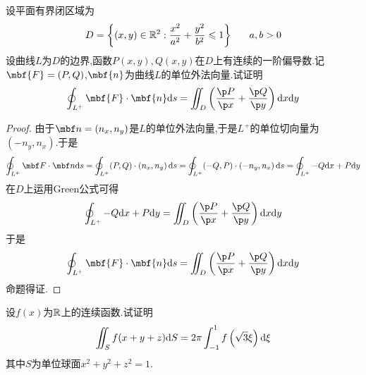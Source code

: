 \documentclass{ctexart}
\begin{document}
\begin{problem}[8.(10\songti{分})]
    设平面有界闭区域为
    \[D=\left\{(x,y)\in\R^2:\dfrac{x^2}{a^2}+\dfrac{y^2}{b^2}\leqslant1\right\}\ \ \ \ \ a,b>0\]
    设曲线$L$为$D$的边界,函数$P(x,y),Q(x,y)$在$D$上有连续的一阶偏导数.记$\mbf{F}=(P,Q)$,$\mbf{n}$为曲线$L$的单位外法向量.试证明
    \[\oint_{L^+}\mbf{F}\cdot\mbf{n}\di s=\iint_{D}\left(\dfrac{\p P}{\p x}+\dfrac{\p Q}{\p y}\right)\di x\di y\]
\end{problem}
\begin{proof}
    由于$\mbf n=\left(n_x,n_y\right)$是$L$的单位外法向量,于是$L^+$的单位切向量为$\left(-n_y,n_x\right)$.于是
    \[\oint_{L^+}\mbf F\cdot\mbf n\di s
    =\oint_{L^+}(P,Q)\cdot\left(n_x,n_y\right)\di s
    =\oint_{L^+}(-Q,P)\cdot\left(-n_y,n_x\right)\di s
    =\oint_{L^+}-Q\di x+P\di y\]
    在$D$上运用Green公式可得
    \[\oint_{L^+}-Q\di x+P\di y=\iint_D\left(\dfrac{\p P}{\p x}+\dfrac{\p Q}{\p y}\right)\di x\di y\]
    于是
    \[\oint_{L^+}\mbf{F}\cdot\mbf{n}\di s=\iint_{D}\left(\dfrac{\p P}{\p x}+\dfrac{\p Q}{\p y}\right)\di x\di y\]
    命题得证.
\end{proof}
\begin{problem}[9.(10\songti{分})]
    设$f(x)$为$\mathbb{R}$上的连续函数.试证明
    \[\iint_{S}f(x+y+z)\mathrm{d} S=2\pi\int_{-1}^{1}f\left(\sqrt{3}\xi\right)\mathrm{d}\xi\]
    其中$S$为单位球面$x^2+y^2+z^2=1$.
\end{problem}
\end{document}
